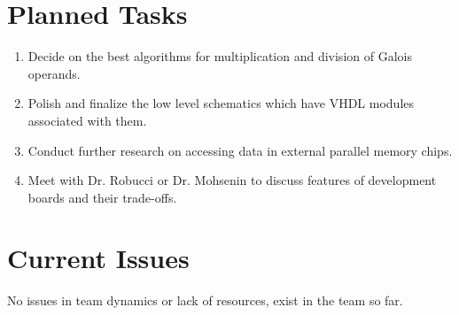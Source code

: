 \documentclass[paper=usletter, fontsize=12pt]{article}
\begin{document}
    \section{Planned Tasks}
    \begin{enumerate}[label=\alph*)]

        \item Decide on the best algorithms for multiplication and division of
        Galois operands.

        \item Polish and finalize the low level schematics which have VHDL
        modules associated with them.

        \item Conduct further research on accessing data in external parallel
        memory chips.

        \item Meet with Dr. Robucci or Dr. Mohsenin to discuss features of
        development boards and their trade-offs.

    \end{enumerate}

    \section{Current Issues} No issues in team dynamics or lack of resources,
    exist in the team so far.
   
\end{document}

